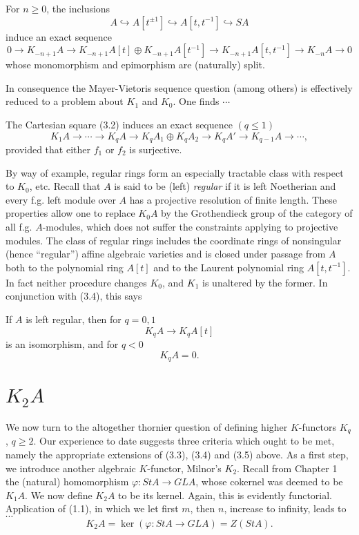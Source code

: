 \begin{theorem}
For $n\geqslant0$, the inclusions
\[A \hookrightarrow A[t^{\pm 1}]\hookrightarrow  A[t,t^{-1}]\hookrightarrow SA\]
induce an exact sequence
\[0 \longrightarrow K_{-n+1} A \longrightarrow K_{-n+1}A[t] \oplus K_{-n+1}A[t^{-1}] \longrightarrow K_{-n+1}A[t,t^{-1}]\longrightarrow K_{-n}A \longrightarrow 0\]
whose monomorphism and epimorphism are (naturally) split.
\end{theorem}
In consequence the Mayer-Vietoris sequence question (among others) is effectively reduced to a problem about $K_1$ and $K_0$. One finds $\cdots$
\begin{theorem}
The Cartesian square (3.2) induces an exact sequence $(q\leqslant 1)$
\[K_1A\longrightarrow \cdots \longrightarrow K_q A \longrightarrow K_q A_1\oplus K_qA_2 \longrightarrow K_q A' \longrightarrow K_{q-1}A\longrightarrow \cdots,\]
provided that either $f_1$ or $f_2$ is surjective.
\end{theorem}
By way of example, regular rings form an especially tractable class with respect to $K_0$, etc. Recall that $A$ is said to be (left) {\em regular} if it is left Noetherian and every f.g. left module over $A$ has a projective resolution of finite length. These properties allow one to replace $K_0A$ by the Grothendieck group of the category of all f.g. $A$-modules, which does not suffer the constraints applying to projective modules. The class of regular rings includes the coordinate rings of nonsingular (hence ``regular'') affine algebraic varieties and is closed under passage from $A$ both to the polynomial ring $A[t]$ and to the Laurent polynomial ring $A[t,t^{-1}]$. In fact neither procedure changes $K_0$, and $K_1$ is unaltered by the former. In conjunction with (3.4), this says
\begin{prop}
  If $A$ is left regular, then for $q = 0, 1$
\[K_qA \longrightarrow K_qA[t]\]
 is an isomorphism, and for $q < 0$ 
 $$K_qA = 0 .$$
\end{prop}

\section*{$K_2A$}
We now turn to the altogether thornier question of defining higher $K$-functors $K_q$, $q \geqslant 2$. Our experience to date suggests three criteria which ought to be met, namely the appropriate extensions of (3.3), (3.4) and (3.5) above. As a first step, we introduce another algebraic $K$-functor, Milnor's $K_2$. Recall from Chapter 1 the (natural) homomorphism $\varphi\colon   StA \longrightarrow GLA$, whose cokernel was deemed to be $K_1A$. We now define $K_2 A$ to be its kernel. Again, this is evidently functorial. Application of (1.1), in which we let first $m$, then $n$, increase to infinity, leads to $\cdots$
\begin{equation}
  K_2A =\ker (\varphi\colon  StA\longrightarrow GLA) = Z(StA).
\end{equation}

